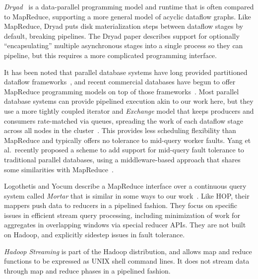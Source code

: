 \emph{Dryad}~\cite{dryad07} is a data-parallel programming model and runtime
that is often compared to MapReduce, supporting a more general model of acyclic
dataflow graphs.  Like MapReduce, Dryad puts disk materialization steps between
dataflow stages by default, breaking pipelines.  The Dryad paper describes
support for optionally ``encapsulating'' multiple asynchronous stages into a
single process so they can pipeline, but this requires a more complicated
programming interface.

It has been noted that parallel database systems have long provided partitioned
dataflow frameworks~\cite{pavlo09}, and recent commercial databases have begun
to offer MapReduce programming models on top of those frameworks~\cite{aster,greenplum}.  
Most parallel database systems can provide pipelined execution akin to our work here, 
but they use a more tightly coupled iterator and \emph{Exchange} model that keeps 
producers and consumers rate-matched via queues, spreading the work of each dataflow 
stage across all nodes in the cluster~\cite{exchange}.  This provides less scheduling 
flexibility than MapReduce and typically offers no tolerance to mid-query worker
faults. Yang et al.\ recently proposed a scheme to add support for mid-query
fault tolerance to traditional parallel databases, using a middleware-based
approach that shares some similarities with MapReduce~\cite{osprey-icde}.

Logothetis and Yocum describe a MapReduce interface over a continuous query
system called \emph{Mortar} that is similar in some ways to our
work~\cite{logoyocum08}.  Like HOP, their mappers push data to reducers in a
pipelined fashion.  They focus on specific issues in efficient stream query
processing, including minimization of work for aggregates in overlapping windows
via special reducer APIs.  They are not built on Hadoop, and explicitly sidestep
issues in fault tolerance.

\emph{Hadoop Streaming} is part of the Hadoop distribution, and allows map and
reduce functions to be expressed as UNIX shell command lines.  It does not
stream data through map and reduce phases in a pipelined fashion.

